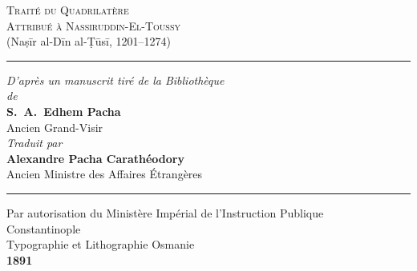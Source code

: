 \documentclass[11pt,a4paper]{article}
\theoremstyle{plain}
\theoremstyle{definition}
\theoremstyle{remark}
\newcommand{\shortline}{\noindent\rule{0.5\textwidth}{0.4pt}\par}
\begin{document}
\thispagestyle{empty}
\begin{center}
\vspace*{2cm}

{\fontsize{28}{34}\selectfont\textsc{Traité du Quadrilatère}}\\[0.8cm]
{\Large\textsc{Attribué à Nassiruddin-El-Toussy}}\\[0.3cm]
{\large (Naṣīr al-Dīn al-Ṭūsī, 1201–1274)}\\[1cm]

\shortline

\vspace{0.8cm}
{\large\textit{D'après un manuscrit tiré de la Bibliothèque}}\\[0.2cm]
{\large\textit{de}}\\[0.2cm]
{\large\textbf{S.~A.~Edhem Pacha}}\\[0.1cm]
{\normalsize Ancien Grand-Visir}\\[0.6cm]

{\large\textit{Traduit par}}\\[0.2cm]
{\Large\textbf{Alexandre Pacha Carathéodory}}\\[0.1cm]
{\normalsize Ancien Ministre des Affaires Étrangères}\\[1.2cm]

\shortline

\vspace{0.5cm}
{\small Par autorisation du Ministère Impérial de l'Instruction Publique}\\[1.5cm]

{\Large Constantinople}\\[0.2cm]
{Typographie et Lithographie Osmanie}\\[0.3cm]
{\large\textbf{1891}}\\[2cm]

\end{center}
\clearpage
\end{document}
